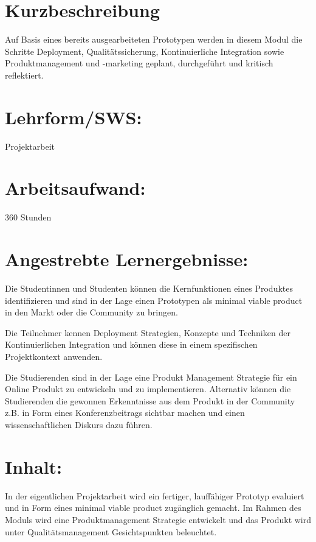 \section*{Kurzbeschreibung}\label{kurzbeschreibung-3}

Auf Basis eines bereits ausgearbeiteten Prototypen werden in diesem
Modul die Schritte Deployment, Qualitätssicherung, Kontinuierliche
Integration sowie Produktmanagement und -marketing geplant, durchgeführt
und kritisch reflektiert.

\section*{Lehrform/SWS:}\label{lehrformsws-9}

Projektarbeit

\section*{Arbeitsaufwand:}\label{arbeitsaufwand-15}

360 Stunden

\section*{Angestrebte
Lernergebnisse:}\label{angestrebte-lernergebnisse-9}

Die Studentinnen und Studenten können die Kernfunktionen eines Produktes
identifizieren und sind in der Lage einen Prototypen als minimal viable
product in den Markt oder die Community zu bringen.

Die Teilnehmer kennen Deployment Strategien, Konzepte und Techniken der
Kontinuierlichen Integration und können diese in einem spezifischen
Projektkontext anwenden.

Die Studierenden sind in der Lage eine Produkt Management Strategie für
ein Online Produkt zu entwickeln und zu implementieren. Alternativ
können die Studierenden die gewonnen Erkenntnisse aus dem Produkt in der
Community z.B. in Form eines Konferenzbeitrags sichtbar machen und einen
wissenschaftlichen Diskurs dazu führen.

\section*{Inhalt:}\label{inhalt-9}

In der eigentlichen Projektarbeit wird ein fertiger, lauffähiger
Prototyp evaluiert und in Form eines minimal viable product zugänglich
gemacht. Im Rahmen des Moduls wird eine Produktmanagement Strategie
entwickelt und das Produkt wird unter Qualitätsmanagement
Gesichtspunkten beleuchtet.

